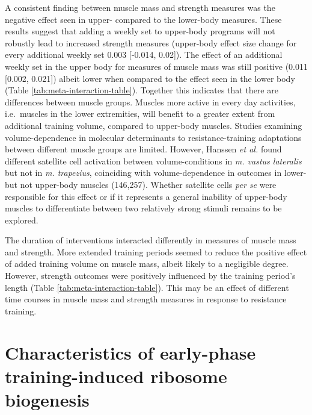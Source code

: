 \documentclass[twoside,10pt]{gihclass} %
\begin{document}
A consistent finding between muscle mass and strength measures was the negative effect seen in upper- compared to the lower-body measures.
These results suggest that adding a weekly set to upper-body programs will not robustly lead to increased strength measures (upper-body effect size change for every additional weekly set 0.003 {[}-0.014, 0.02{]}).
The effect of an additional weekly set in the upper body for measures of muscle mass was still positive (0.011 {[}0.002, 0.021{]}) albeit lower when compared to the effect seen in the lower body (Table \ref{tab:meta-interaction-table}).
Together this indicates that there are differences between muscle groups. Muscles more active in every day activities, i.e.~muscles in the lower extremities, will benefit to a greater extent from additional training volume, compared to upper-body muscles.
Studies examining volume-dependence in molecular determinants to resistance-training adaptations between different muscle groups are limited.
However, Hanssen \emph{et al.} found different satellite cell activation between volume-conditions in \emph{m. vastus lateralis} but not in \emph{m. trapezius}, coinciding with volume-dependence in outcomes in lower- but not upper-body muscles
(146,257).
Whether satellite cells \emph{per se} were responsible for this effect or if it represents a general inability of upper-body muscles to differentiate between two relatively strong stimuli remains to be explored.

The duration of interventions interacted differently in measures of muscle mass and strength. More extended training periods seemed to reduce the positive effect of added training volume on muscle mass, albeit likely to a negligible degree. However, strength outcomes were positively influenced by the training period's length (Table \ref{tab:meta-interaction-table}). This may be an effect of different time courses in muscle mass and strength measures in response to resistance training.

\hypertarget{characteristics-of-early-phase-training-induced-ribosome-biogenesis}{%
\section{Characteristics of early-phase training-induced ribosome biogenesis}\label{characteristics-of-early-phase-training-induced-ribosome-biogenesis}}
\end{document}
